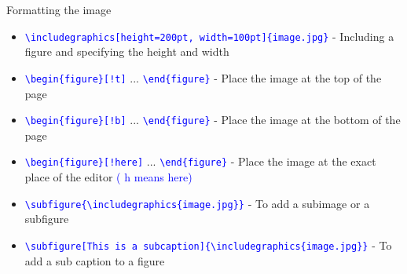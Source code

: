\documentclass{beamer}
\begin{document}
	\begin{frame}{Formatting the image}
		\begin{itemize}
			\item \texttt{\textcolor{blue}{\textbackslash includegraphics[height=200pt, width=100pt]\{image.jpg\}}} - Including a figure and specifying the height and width
			
			\item \texttt{\textcolor{blue}{\textbackslash begin\{figure\}[!t]}} ... \texttt{\textcolor{blue}{\textbackslash end\{figure\}}} - Place the image at the top of the page
			
			\item \texttt{\textcolor{blue}{\textbackslash begin\{figure\}[!b]}} ... \texttt{\textcolor{blue}{\textbackslash end\{figure\}}} - Place the image at the bottom of the page
			
			\item \texttt{\textcolor{blue}{\textbackslash begin\{figure\}[!here]}} ... \texttt{\textcolor{blue}{\textbackslash end\{figure\}}} - Place the image at the exact place of the editor \textcolor{blue}{( h means here)}
			
			\item \texttt{\textcolor{blue}{\textbackslash subfigure\{\textbackslash includegraphics\{image.jpg\}\}}} - To add a subimage or a subfigure
			
			\item \texttt{\textcolor{blue}{\textbackslash subfigure[This is a subcaption]\{\textbackslash includegraphics\{image.jpg\}\}}} - To add a sub caption to a figure
			
		\end{itemize}
	\end{frame}
	
	
	
\end{document}
